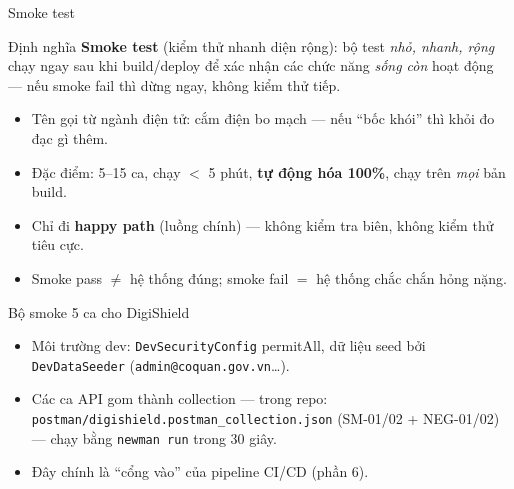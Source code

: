 \documentclass[aspectratio=169,12pt]{beamer}
\begin{document}
\begin{frame}{Smoke test}
  \begin{block}{Định nghĩa}
    \textbf{Smoke test} (kiểm thử nhanh diện rộng): bộ test \emph{nhỏ, nhanh, rộng} chạy ngay sau khi build/deploy để xác nhận các chức năng \emph{sống còn} hoạt động --- nếu smoke fail thì \alert{dừng ngay}, không kiểm thử tiếp.
  \end{block}
  \begin{itemize}
    \item Tên gọi từ ngành điện tử: cắm điện bo mạch --- nếu ``bốc khói'' thì khỏi đo đạc gì thêm.
    \item Đặc điểm: 5--15 ca, chạy $<$ 5 phút, \textbf{tự động hóa 100\%}, chạy trên \emph{mọi} bản build.
    \item Chỉ đi \textbf{happy path} (luồng chính) --- không kiểm tra biên, không kiểm thử tiêu cực.
    \item Smoke pass $\neq$ hệ thống đúng; smoke fail $=$ hệ thống chắc chắn hỏng nặng.
  \end{itemize}
\end{frame}

\begin{frame}{Bộ smoke 5 ca cho DigiShield}
  \small
  \begin{table}
  \end{table}
  \begin{itemize}
    \item Môi trường dev: \texttt{DevSecurityConfig} permitAll, dữ liệu seed bởi \texttt{DevDataSeeder} (\texttt{admin@coquan.gov.vn}\ldots).
    \item Các ca API gom thành collection --- trong repo: \texttt{postman/digishield.postman\_collection.json} (SM-01/02 + NEG-01/02) --- chạy bằng \texttt{newman run} trong 30 giây.
    \item Đây chính là ``cổng vào'' của pipeline CI/CD (phần 6).
  \end{itemize}
\end{frame}
\end{document}
